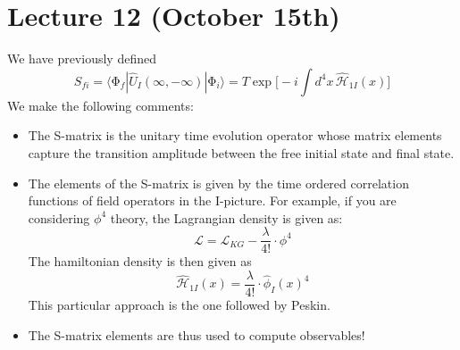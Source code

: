 \section{Lecture 12 (October 15th)}
\begin{rmk}
We have previously defined
\[S_{fi}=\langle \mathrm{\Phi} _{f}|\hat{U}_{I}(\infty ,-\infty )|\mathrm{\Phi} _{i}\rangle =T\exp \Big[-i\int d^{4}x\,\hat{\mathcal{H}}_{1I}(x)\Big]\]
We make the following comments:
\begin{itemize}
\item[(i)] The S-matrix is the unitary time evolution operator whose matrix elements capture the transition amplitude between the free initial state and final state.
\item[(ii)] The elements of the S-matrix is given by the time ordered correlation functions of field operators in the I-picture. For example, if you are considering $\phi ^{4}$ theory, the Lagrangian density is given as:
\[\mathcal{L}=\mathcal{L}_{KG}-\dfrac{\lambda }{4!}\cdot \phi ^{4}\]
The hamiltonian density is then given as
\[\hat{\mathcal{H}}_{1I}(x)=\dfrac{\lambda }{4!}\cdot \hat{\phi }_{I}(x)^{4} \]
This particular approach is the one followed by Peskin.
\item[(iii)] The S-matrix elements are thus used to compute observables! 
\end{itemize}
\end{rmk}
\vspace{2ex}
